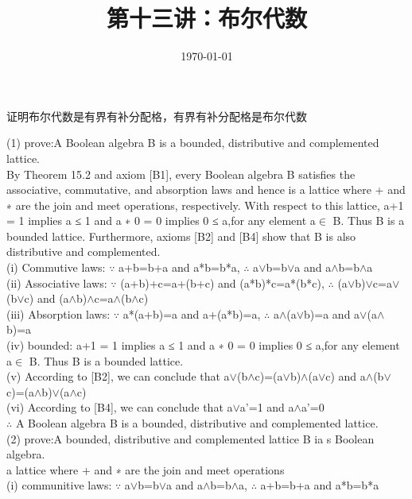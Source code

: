 \documentclass[11pt, a4paper, UTF8]{ctexart}
\title{第十三讲：布尔代数}
\date{\today}     %
\begin{document}
\maketitle
\noplagiarism	%
\beginthishw	%


\begin{problem}[第一题]
证明布尔代数是有界有补分配格，有界有补分配格是布尔代数
\end{problem}

\begin{solution}
(1) prove:A Boolean algebra B is a bounded, distributive and complemented lattice.\\
By Theorem 15.2 and axiom [B1], every Boolean algebra B satisfies the associative, commutative, and absorption laws and hence is a lattice where + and ∗ are the join and meet operations, respectively. With respect to this lattice, a+1 = 1 implies a ≤ 1 and a ∗ 0 = 0 implies 0 ≤ a,for any element a$\in$ B. Thus B is a bounded lattice. Furthermore, axioms [B2] and [B4] show that B is also distributive and complemented.\\
(i) Commutive laws: $\because$ a+b=b+a and a*b=b*a, $\therefore$ a$\vee$b=b$\vee$a and a$\wedge$b=b$\wedge$a\\
(ii) Associative laws: $\because$ (a+b)+c=a+(b+c) and (a*b)*c=a*(b*c), $\therefore$ (a$\vee$b)$\vee$c=a$\vee$(b$\vee$c) and (a$\wedge$b)$\wedge$c=a$\wedge$(b$\wedge$c)\\
(iii) Absorption laws: $\because$ a*(a+b)=a and a+(a*b)=a, $\therefore$ a$\wedge$(a$\vee$b)=a and a$\vee$(a$\wedge$b)=a\\
(iv) bounded: a+1 = 1 implies a ≤ 1 and a ∗ 0 = 0 implies 0 ≤ a,for any element a$\in$ B. Thus B is a bounded lattice.\\
(v) According to [B2], we can conclude that a$\vee$(b$\wedge$c)=(a$\vee$b)$\wedge$(a$\vee$c) and a$\wedge$(b$\vee$c)=(a$\wedge$b)$\vee$(a$\wedge$c)\\
(vi) According to [B4], we can conclude that a$\vee$a'=1 and a$\wedge$a'=0\\
$\therefore$ A Boolean algebra B is a bounded, distributive and complemented lattice.\\
(2) prove:A bounded, distributive and complemented lattice B ia s Boolean algebra.\\
a lattice where + and ∗ are the join and meet operations\\
(i) communitive laws: $\because$ a$\vee$b=b$\vee$a and a$\wedge$b=b$\wedge$a, $\therefore$ a+b=b+a and a*b=b*a\\

\end{solution}
\end{document}
